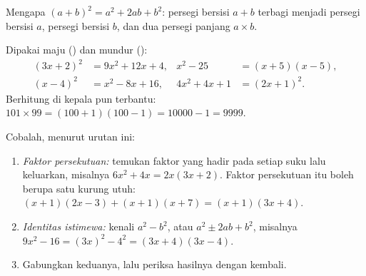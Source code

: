 \begin{omfigure}

{\small Mengapa $(a+b)^2 = a^2 + 2ab + b^2$: persegi bersisi $a + b$ terbagi
menjadi persegi bersisi $a$, persegi bersisi $b$, dan dua persegi panjang
$a \times b$.}
\end{omfigure}

\begin{example}\label{ex:g10:algebra:identities}
Dipakai maju () dan mundur ():
\begin{align*}
(3x + 2)^2 &= 9x^2 + 12x + 4,
& x^2 - 25 &= (x+5)(x-5), \\
(x - 4)^2 &= x^2 - 8x + 16,
& 4x^2 + 4x + 1 &= (2x + 1)^2 .
\end{align*}
Berhitung di kepala pun terbantu: $101 \times 99 = (100+1)(100-1) =
10000 - 1 = 9999$.
\end{example}

\begin{method}\label{met:g10:algebra:factor}
Cobalah, menurut urutan ini:
\begin{enumerate}
  \item \emph{Faktor persekutuan:} temukan faktor yang hadir pada setiap suku
        lalu keluarkan, misalnya $6x^2 + 4x = 2x(3x + 2)$. Faktor persekutuan
        itu boleh berupa satu kurung utuh:
        $(x+1)(2x-3) + (x+1)(x+7) = (x+1)(3x+4)$.
  \item \emph{Identitas istimewa:} kenali $a^2 - b^2$, atau
        $a^2 \pm 2ab + b^2$, misalnya $9x^2 - 16 = (3x)^2 - 4^2 =
        (3x+4)(3x-4)$.
  \item Gabungkan keduanya, lalu periksa hasilnya dengan  kembali.
\end{enumerate}
\end{method}

